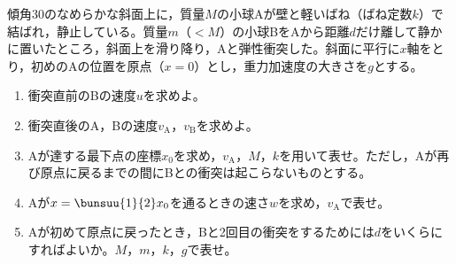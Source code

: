 \hakosyokika
\item
    \begin{mawarikomi}{150pt}{}
        傾角30\Deg のなめらかな斜面上に，質量$M$の小球Aが壁と軽いばね（ばね定数$k$）で結ばれ，静止している。質量$m$（$<M$）の小球BをAから距離$d$だけ離して静かに置いたところ，斜面上を滑り降り，Aと弾性衝突した。斜面に平行に$x$軸をとり，初めのAの位置を原点（$x=0$）とし，重力加速度の大きさを$g$とする。
        \begin{enumerate}
            \item 衝突直前のBの速度$u$を求めよ。
            \item 衝突直後のA，Bの速度$v_\mathrm{A}$，$v_\mathrm{B}$を求めよ。
            \item Aが達する最下点の座標$x_0$を求め，$v_\mathrm{A}$，$M$，$k$を用いて表せ。ただし，Aが再び原点に戻るまでの間にBとの衝突は起こらないものとする。
            \item Aが$x=\bunsuu{1}{2}x_0$を通るときの速さ$w$を求め，$v_\mathrm{A}$で表せ。
            \item Aが初めて原点に戻ったとき，Bと2回目の衝突をするためには$d$をいくらにすればよいか。$M$，$m$，$k$，$g$で表せ。
        \end{enumerate}
    \end{mawarikomi}